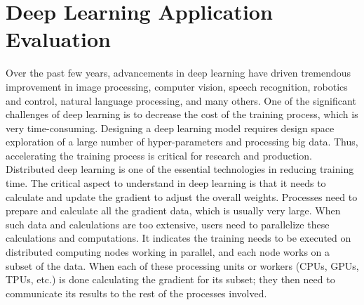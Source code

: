 \documentclass[sigconf]{acmart}
\begin{document}
\section{Deep Learning Application Evaluation}\label{sec:application}
Over the past few years, advancements in deep learning have driven tremendous improvement in image processing, computer vision, speech recognition, robotics and control, natural language processing, and many others. One of the significant challenges of deep learning is to decrease the cost of the training process, which is very time-consuming. 
%
Designing a deep learning model
requires design space exploration of a large number of hyper-parameters and processing big data.
Thus, accelerating the training process is critical for research and production. Distributed deep learning is one of the essential technologies in reducing training time.
%
The critical aspect to understand in deep learning is that it needs to calculate and update 
the gradient to adjust the overall weights. 
%
Processes need to prepare and calculate all the gradient data, which is usually very large. 
When such data and calculations are too extensive, users need to parallelize these calculations and computations.
%
It indicates the training needs to be executed on distributed computing nodes working 
in parallel, and each node works on a subset of the data.
%
When each of these processing units or workers (CPUs, GPUs, TPUs, etc.) is done 
calculating the gradient for its subset; they then need to communicate its results 
to the rest of the processes involved.
\end{document}
